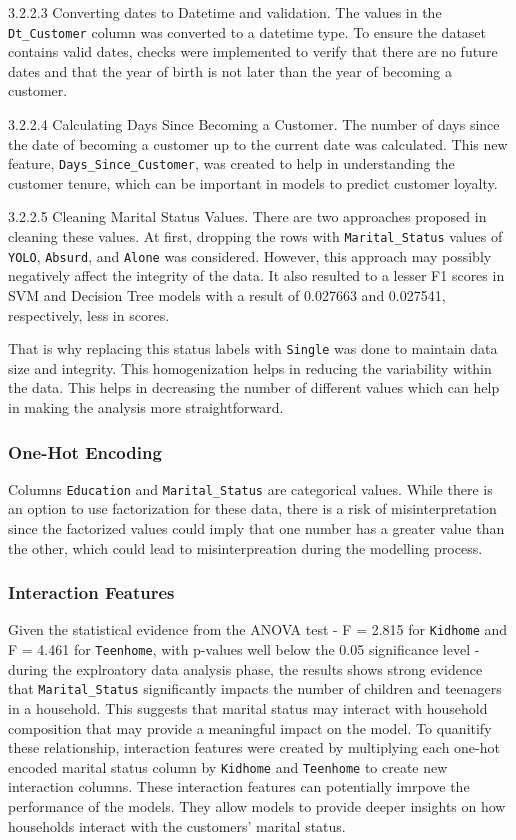     3.2.2.3 Converting dates to Datetime and validation. The values in the \texttt{Dt\_Customer} column was converted to a datetime type. To ensure the dataset contains valid dates, checks were implemented to verify that there are no future dates and that the year of birth is not later than the year of becoming a customer.

    3.2.2.4 Calculating Days Since Becoming a Customer. The number of days since the date of becoming a customer up to the current date was calculated. This new feature, \texttt{Days\_Since\_Customer}, was created to help in understanding the customer tenure, which can be important in models to predict customer loyalty.

    3.2.2.5 Cleaning Marital Status Values. There are two approaches proposed in cleaning these values. At first, dropping the rows with \texttt{Marital\_Status} values of \texttt{YOLO}, \texttt{Absurd}, and \texttt{Alone} was considered. However, this approach may possibly negatively affect the integrity of the data. It also resulted to a lesser F1 scores in SVM and Decision Tree models with a result of 0.027663 and 0.027541, respectively, less in scores.
    
    That is why replacing this status labels with \texttt{Single} was done to maintain data size and integrity. This homogenization helps in reducing the variability within the data. This helps in decreasing the number of different values which can help in making the analysis more straightforward.

\subsubsection{One-Hot Encoding}

Columns \texttt{Education} and \texttt{Marital\_Status} are categorical values. While there is an option to use factorization for these data, there is a risk of misinterpretation since the factorized values could imply that one number has a greater value than the other, which could lead to misinterpreation during the modelling process. 

\subsubsection{Interaction Features}

Given the statistical evidence from the ANOVA test - F = 2.815 for \texttt{Kidhome} and F = 4.461 for \texttt{Teenhome}, with p-values well below the 0.05 significance level - during the explroatory data analysis phase, the results shows strong evidence that \texttt{Marital\_Status} significantly impacts the number of children and teenagers in a household. This suggests that marital status may interact with household composition that may provide a meaningful impact on the model. To quanitify these relationship, interaction features were created by multiplying each one-hot encoded marital status column by \texttt{Kidhome} and \texttt{Teenhome} to create new interaction columns. These interaction features can potentially imrpove the performance of the models. They allow models to provide deeper insights on how households interact with the customers' marital status.

